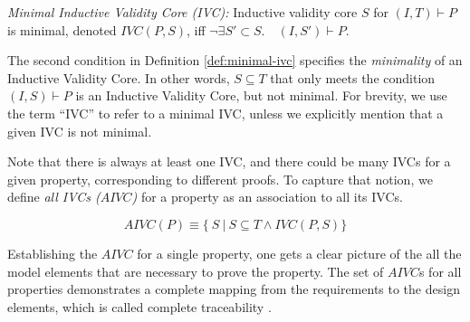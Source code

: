 %

\begin{definition}{\emph{Minimal Inductive Validity Core (IVC):}}
  \label{def:minimal-ivc}
  Inductive validity core $S$ for $(I, T)\vdash P$ is minimal, denoted $IVC(P, S)$, iff
  $\neg\exists S' \subset S .\quad (I, S') \vdash P $.
\end{definition}

\noindent The second condition in Definition \ref{def:minimal-ivc}
specifies the \emph{minimality} of an Inductive Validity Core.
In other words, $S \subseteq T$ that only meets the condition $(I, S) \vdash P$ is
an Inductive Validity Core, but not minimal.
For brevity, we use the term ``IVC'' to refer to a minimal IVC, unless
we explicitly mention that a given IVC is not minimal. 

Note that there is always at least one IVC, and there could be many IVCs for a given property, corresponding to different proofs. To capture that notion, we define \emph{all IVCs ($AIVC$)} for a property as an association to all its IVCs.

$$ AIVC(P) \equiv  \{\ S~|~S \subseteq T \land  IVC(P, S)\} $$

\noindent
Establishing the $AIVC$ for a single property, one gets a clear picture of the all the model elements that are necessary to prove the property. The set of $AIVC$s for all properties demonstrates a complete mapping from the requirements to the design elements, which is called complete traceability \cite{Murugesan16:renext}.

